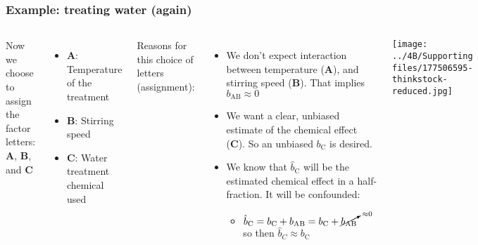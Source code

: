 \begin{frame}\frametitle{Example: treating water (again)}
	
	\begin{columns}[T]
			Now we choose to assign the factor letters: \textbf{A}, \textbf{B}, and \textbf{C}
			
			\vspace{0.25cm}
			\begin{itemize} 
				\item	\textbf{A}: Temperature of the treatment
				\item	\textbf{B}: Stirring speed				
				\item	\textbf{C}: Water treatment chemical used

			\end{itemize}
			
			\vspace{0.5cm}
			Reasons for this choice of letters (assignment):
			\begin{itemize}
				\item	We don't expect interaction between temperature (\textbf{A}), and stirring speed (\textbf{B}). That implies $b_\text{AB} \approx 0$
				\item	We want a clear, unbiased estimate of the chemical effect (\textbf{C}). So an unbiased $b_\text{C}$ is desired.
				\item	We know that $\hat{b}_\text{C}$ will be the estimated chemical effect in a half-fraction. It will
					 	be confounded:
				\begin{itemize}
					\item	$\hat{b}_\text{C}  = b_\text{C} + b_\text{AB}  = b_\text{C} + \cancelto{\approx 0}{b_\text{AB}} \qquad$ so then $\hat{b}_C \approx b_\text{C}$
				\end{itemize}
			\end{itemize}
		
			\texttt{[image: ../4B/Supporting files/177506595-thinkstock-reduced.jpg]}
	\end{columns}
\end{frame}

